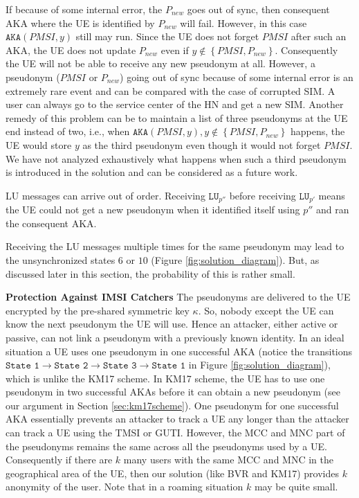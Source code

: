 \documentclass{llncs} %
\begin{document}
If because of some internal error, the $P_{new}$ goes out of sync, then consequent AKA where the UE is identified by $P_{new}$ will fail.  However, in this case $\texttt{AKA}(PMSI,y)$ still may run. Since the UE does not forget $PMSI$ after such an AKA, the UE does not update $P_{new}$ even if $y \notin \left\lbrace PMSI,P_{new} \right\rbrace$. Consequently the UE will not be able to receive any new pseudonym at all. However, a pseudonym ($PMSI$ or $P_{new}$) going out of sync because of some internal error is an extremely rare event and can be compared with the case of corrupted SIM. A user can always go to the service center of the HN and get a new SIM. Another remedy of this problem can be to maintain a list of three pseudonyms at the UE end instead of two, i.e., when $\texttt{AKA}(PMSI,y), y \notin \left\lbrace PMSI,P_{new} \right\rbrace$ happens, the UE would store $y$ as the third pseudonym even though it would not forget $PMSI$.  We have not analyzed exhaustively what happens when such a third pseudonym is introduced in the solution and can be considered as a future work.

LU messages can arrive out of order. Receiving $\texttt{LU}_{p''}$ before receiving $\texttt{LU}_{p'}$ means the UE could not get a new pseudonym when it identified itself using $p''$ and ran the consequent AKA. 

Receiving the LU messages multiple times for the same pseudonym may lead to the unsynchronized states $6$ or $10$ (Figure \ref{fig:solution_diagram}). But, as discussed later in this section, the probability of this is rather small.

\textbf{Protection Against IMSI Catchers} The pseudonyms are delivered to the UE encrypted by the pre-shared symmetric key $\kappa$. So, nobody except the UE can know the next pseudonym the UE will use. Hence an attacker, either active or passive, can not link a pseudonym with a previously known identity. In an ideal situation a UE uses one pseudonym in one successful AKA (notice the transitions $ \texttt{State 1} \rightarrow \texttt{State 2} \rightarrow \texttt{State 3} \rightarrow \texttt{State 1}$ in Figure \ref{fig:solution_diagram}), which is unlike the KM17 scheme. In KM17 scheme, the UE has to use one pseudonym in two successful AKAs before it can obtain a new pseudonym (see our argument in Section \ref{sec:km17scheme}). One pseudonym for one successful AKA essentially prevents an attacker to track a UE any longer than the attacker can track a UE using the TMSI or GUTI. However, the MCC and MNC part of the pseudonyms remains the same across all the pseudonyms used by a UE. Consequently if there are $k$ many users with the same MCC and MNC in the geographical area of the UE, then our solution (like BVR and KM17) provides $k$ anonymity of the user. Note that in a roaming situation $k$ may be quite small.
\end{document}

